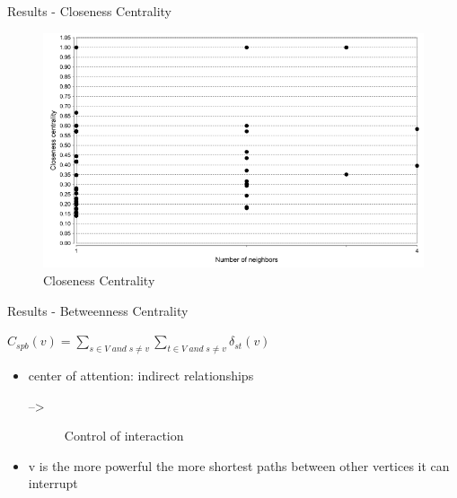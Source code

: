\begin{frame}{Results - Closeness Centrality}
	\begin{figure}
		\includegraphics[scale=0.4]{inc/img/Glyco1/ClosenessCentr.png}
	\caption{Closeness Centrality}
	\end{figure}
\end{frame}
\begin{frame}{Results - Betweenness Centrality}
	\begin{definition}
		$C_{spb}(v)=\sum\limits_{s \in V\; and\; s \neq v} \sum\limits_{t \in V\; and\; s \neq v} \delta_{st}(v)$
	\end{definition}
	\begin{itemize}
		\item center of attention: indirect relationships 
		\begin{description}
			\item[-->] Control of interaction
		\end{description}
		\item v is the more powerful the more shortest paths between other vertices it can interrupt
	\end{itemize}
\end{frame}
